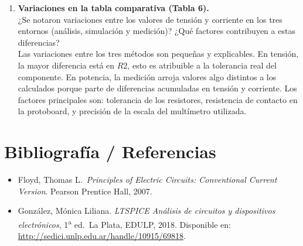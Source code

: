 \documentclass[12pt,a4paper]{article}
\begin{document}
\begin{enumerate}[leftmargin=*, label=\textbf{\arabic*.}]
    \item \textbf{Variaciones en la tabla comparativa (Tabla 6).}\\
    ¿Se notaron variaciones entre los valores de tensión y corriente
    en los tres entornos (análisis, simulación y medición)?
    ¿Qué factores contribuyen a estas diferencias?\\[4pt]
    Las variaciones entre los tres métodos son pequeñas y explicables. En tensión, la mayor diferencia está en $R2$,
    esto es atribuible a la tolerancia real del componente. En potencia, la medición arroja valores algo distintos a los
    calculados porque parte de diferencias acumuladas en tensión y corriente. Los factores principales son: tolerancia de
    los resistores, resistencia de contacto en la protoboard, y precisión de la escala del multímetro utilizada.
 
\end{enumerate}
 
\section{Bibliografía / Referencias}
 
\begin{itemize}
    \item Floyd, Thomas L.\ \textit{Principles of Electric Circuits: Conventional
    Current Version}. Pearson Prentice Hall, 2007.
 
    \item González, Mónica Liliana. \textit{LTSPICE Análisis de circuitos y
    dispositivos electrónicos}, 1\textsuperscript{a} ed.\ La Plata, EDULP, 2018.
    Disponible en: \url{http://sedici.unlp.edu.ar/handle/10915/69818}.
\end{itemize}
 
\end{document}
